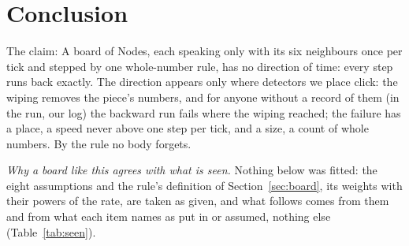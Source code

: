 \documentclass[pdflatex,sn-mathphys-num]{sn-jnl}
\begin{document}
\section{Conclusion}\label{sec:conclusion}

The claim: A board of Nodes, each speaking only with its six neighbours once per tick and stepped by one whole-number rule, has no direction of time: every step runs back exactly. The direction appears only where detectors we place click: the wiping removes the piece's numbers, and for anyone without a record of them (in the run, our log) the backward run fails where the wiping reached; the failure has a place, a speed never above one step per tick, and a size, a count of whole numbers. By the rule no body forgets.

\textit{Why a board like this agrees with what is seen.} Nothing below was fitted: the eight assumptions and the rule's definition of Section~\ref{sec:board}, its weights with their powers of the rate, are taken as given, and what follows comes from them and from what each item names as put in or assumed, nothing else (Table~\ref{tab:seen}).
\end{document}
